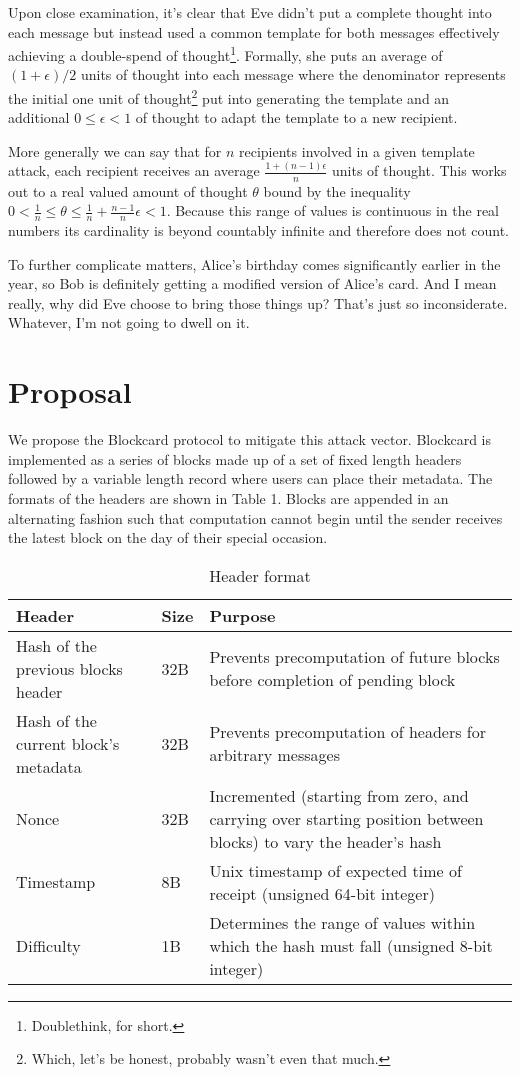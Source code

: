 \documentclass[
parskip=half
]{article}
\begin{document}
Upon close examination, it’s clear that Eve didn’t put a complete thought into each message but instead used a common template for both messages effectively achieving a double-spend of thought\footnote{Doublethink, for short.}. Formally, she puts an average of $(1 + \epsilon) / 2$ units of thought into each message where the denominator represents the initial one unit of thought\footnote{Which, let's be honest, probably wasn't even that much.} put into generating the template and an additional $0 \leq \epsilon < 1$ of thought to adapt the template to a new recipient. 

More generally we can say that for $n$ recipients involved in a given template attack, each recipient receives an average $\frac{1 + (n-1)\epsilon}{n}$ units of thought. This works out to a real valued amount of thought $\theta$ bound by the inequality $0 < \frac{1}{n} \leq \theta \leq \frac{1}{n} + \frac{n-1}{n}\epsilon < 1$. Because this range of values is continuous in the real numbers its cardinality is beyond countably infinite and therefore does not count.

To further complicate matters, Alice’s birthday comes significantly earlier in the year, so Bob is definitely getting a modified version of Alice’s card. And I mean really, why did Eve choose to bring those things up? That’s just so inconsiderate. Whatever, I'm not going to dwell on it.


\newpage
\section{Proposal}
We propose the Blockcard protocol to mitigate this attack vector. Blockcard is implemented as a series of blocks made up of a set of fixed length headers followed by a variable length record where users can place their metadata. The formats of the headers are shown in Table 1. Blocks are appended in an alternating fashion such that computation cannot begin until the sender receives the latest block on the day of their special occasion.

\begin{table}
  \caption{Header format}
  \centering
  \begin{tabular}{p{30mm} p{15mm} p{80mm}}
    \toprule
    Header     & Size    & Purpose \\ 
    \midrule
Hash of the previous blocks header & 32B & Prevents precomputation of future blocks before completion of pending block \\
Hash of the current block’s metadata & 32B & Prevents precomputation of headers for arbitrary messages \\
Nonce & 32B & Incremented (starting from zero, and carrying over starting position between blocks) to vary the header's  hash\\ Timestamp & 8B & Unix timestamp of expected time of receipt (unsigned 64-bit integer)\\
Difficulty & 1B & Determines the range of values within which the hash must fall (unsigned 8-bit integer) \\
    \bottomrule
  \end{tabular}
 
\end{table}
\end{document}
